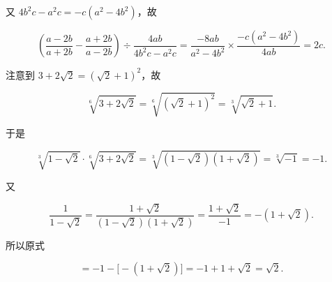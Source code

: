 \begin{answer}
又 $4b^2c-a^2c=-c(a^2-4b^2)$，故

\nopagebreak[4]
\[
\left(\frac{a-2b}{a+2b}-\frac{a+2b}{a-2b}\right)\div\frac{4ab}{4b^2c-a^2c}
=\frac{-8ab}{a^2-4b^2}\times\frac{-c(a^2-4b^2)}{4ab}
=2c.
\]


注意到 $3+2\sqrt2=(\sqrt2+1)^2$，故

\nopagebreak[4]
\[
\sqrt[6]{3+2\sqrt2}=\sqrt[6]{(\sqrt2+1)^2}=\sqrt[3]{\sqrt2+1}.
\]

于是

\nopagebreak[4]
\[
\sqrt[3]{1-\sqrt2}\cdot\sqrt[6]{3+2\sqrt2}
=\sqrt[3]{(1-\sqrt2)(1+\sqrt2)}
=\sqrt[3]{-1}=-1.
\]

又

\nopagebreak[4]
\[
\frac1{1-\sqrt2}=\frac{1+\sqrt2}{(1-\sqrt2)(1+\sqrt2)}=\frac{1+\sqrt2}{-1}=-(1+\sqrt2).
\]

所以原式

\nopagebreak[4]
\[
=-1-\bigl[-(1+\sqrt2)\bigr]=-1+1+\sqrt2=\sqrt2.
\]






\end{answer}
